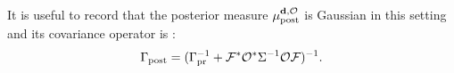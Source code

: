 




It is useful to record that the posterior measure $\mu_{\textup{post}}^{\mathbf{d}, \mathcal{O}}$ is Gaussian
in this setting and its covariance operator is \cite{Stuart10}:
\begin{align}\label{eq:postcov}
  \postcov = (\prcov^{-1} + \fwd^* \obs^* \Sigma^{-1} \obs \fwd
  )^{-1}.
\end{align}


